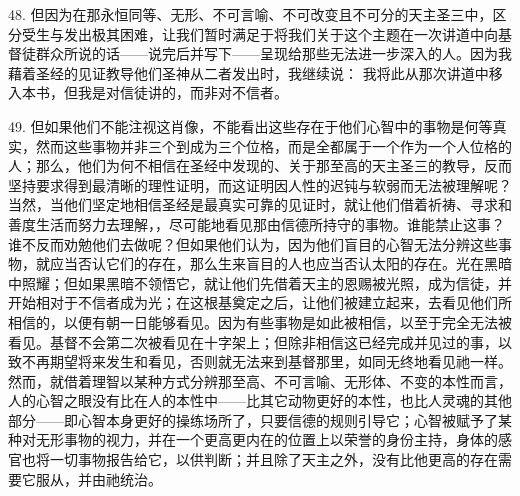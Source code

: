 48. 但因为在那永恒同等、无形、不可言喻、不可改变且不可分的天主圣三中，区分受生与发出极其困难，让我们暂时满足于将我们关于这个主题在一次讲道中向基督徒群众所说的话——说完后并写下——呈现给那些无法进一步深入的人。因为我藉着圣经的见证教导他们圣神从二者发出时，我继续说： 我将此从那次讲道中移入本书，但我是对信徒讲的，而非对不信者。\par

49. 但如果他们不能注视这肖像，不能看出这些存在于他们心智中的事物是何等真实，然而这些事物并非三个到成为三个位格，而是全都属于一个作为一个人位格的人；那么，他们为何不相信在圣经中发现的、关于那至高的天主圣三的教导，反而坚持要求得到最清晰的理性证明，而这证明因人性的迟钝与软弱而无法被理解呢？当然，当他们坚定地相信圣经是最真实可靠的见证时，就让他们借着祈祷、寻求和善度生活而努力去理解，，尽可能地看见那由信德所持守的事物。谁能禁止这事？谁不反而劝勉他们去做呢？但如果他们认为，因为他们盲目的心智无法分辨这些事物，就应当否认它们的存在，那么生来盲目的人也应当否认太阳的存在。光在黑暗中照耀；但如果黑暗不领悟它，就让他们先借着天主的恩赐被光照，成为信徒，并开始相对于不信者成为光；在这根基奠定之后，让他们被建立起来，去看见他们所相信的，以便有朝一日能够看见。因为有些事物是如此被相信，以至于完全无法被看见。基督不会第二次被看见在十字架上；但除非相信这已经完成并见过的事，以致不再期望将来发生和看见，否则就无法来到基督那里，如同无终地看见祂一样。然而，就借着理智以某种方式分辨那至高、不可言喻、无形体、不变的本性而言，人的心智之眼没有比在人的本性中——比其它动物更好的本性，也比人灵魂的其他部分——即心智本身更好的操练场所了，只要信德的规则引导它；心智被赋予了某种对无形事物的视力，并在一个更高更内在的位置上以荣誉的身份主持，身体的感官也将一切事物报告给它，以供判断；并且除了天主之外，没有比他更高的存在需要它服从，并由祂统治。\par

